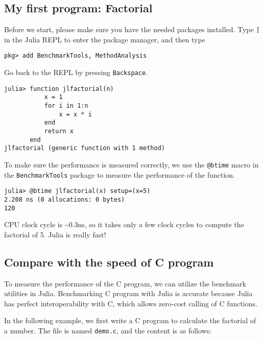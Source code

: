 \documentclass[
  notoc %
]{tufte-book}
\newcommand{\passthrough}[1]{#1}
\begin{document}
\hypertarget{my-first-program-factorial}{%
\subsection{My first program:
Factorial}\label{my-first-program-factorial}}

Before we start, please make sure you have the needed packages
installed. Type \passthrough{\lstinline!]!} in the Julia REPL to enter
the package manager, and then type

\begin{lstlisting}
pkg> add BenchmarkTools, MethodAnalysis
\end{lstlisting}

Go back to the REPL by pressing \passthrough{\lstinline!Backspace!}.

\begin{lstlisting}
julia> function jlfactorial(n)
           x = 1
           for i in 1:n
               x = x * i
           end
           return x
       end
jlfactorial (generic function with 1 method)
\end{lstlisting}

To make sure the performance is measured correctly, we use the
\passthrough{\lstinline!@btime!} macro in the
\passthrough{\lstinline!BenchmarkTools!} package to measure the
performance of the function.

\begin{lstlisting}
julia> @btime jlfactorial(x) setup=(x=5)
2.208 ns (0 allocations: 0 bytes)
120
\end{lstlisting}

CPU clock cycle is \textasciitilde0.3ns, so it takes only a few clock
cycles to compute the factorial of 5. Julia is really fast!

\hypertarget{compare-with-the-speed-of-c-program}{%
\subsection{Compare with the speed of C
program}\label{compare-with-the-speed-of-c-program}}

To measure the performance of the C program, we can utilize the
benchmark utilities in Julia. Benchmarking C program with Julia is
accurate because Julia has perfect interoperability with C, which allows
zero-cost calling of C functions.

In the following example, we first write a C program to calculate the
factorial of a number. The file is named
\passthrough{\lstinline!demo.c!}, and the content is as follows:
\end{document}
